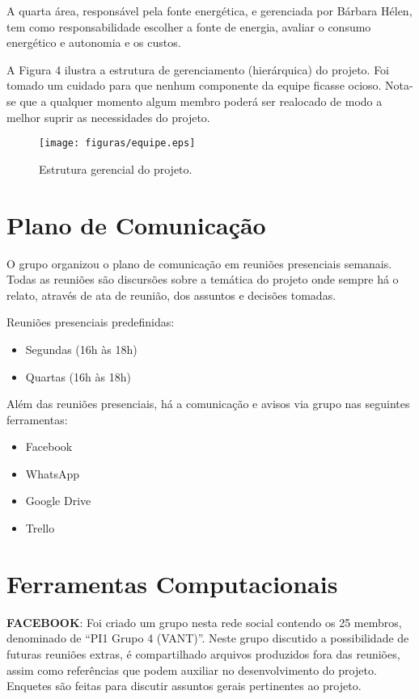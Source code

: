 A quarta área, responsável pela fonte energética, e gerenciada por Bárbara Hélen, tem como responsabilidade escolher a fonte de energia, avaliar o consumo energético e autonomia e os custos.
	
A Figura 4 ilustra a estrutura de gerenciamento (hierárquica) do projeto. Foi tomado um cuidado para que nenhum componente da equipe ficasse ocioso. Nota-se que a qualquer momento algum membro poderá ser realocado de modo a melhor suprir as necessidades do projeto.

\begin{figure}[ht]
	\centering
		\texttt{[image: figuras/equipe.eps]}
	\caption{Estrutura gerencial do projeto.}
\end{figure}

\section{Plano de Comunicação}
O grupo organizou o plano de comunicação em reuniões presenciais semanais. Todas as reuniões são discursões sobre a temática do projeto onde sempre há o relato, através de ata de reunião, dos assuntos e decisões tomadas. 

Reuniões presenciais predefinidas:
\begin{itemize}
	\item Segundas (16h às 18h)
	\item Quartas (16h às 18h)
\end{itemize}

Além das reuniões presenciais, há a comunicação e avisos via grupo nas seguintes ferramentas:
\begin{itemize}
	\item Facebook
	\item WhatsApp
	\item Google Drive
	\item Trello
\end{itemize}

\section{Ferramentas Computacionais}

\textbf{FACEBOOK}:
Foi criado um grupo nesta rede social contendo os 25 membros, denominado de “PI1 Grupo 4 (VANT)”. Neste grupo discutido a possibilidade de futuras reuniões extras, é compartilhado arquivos produzidos fora das reuniões, assim como referências que podem auxiliar no desenvolvimento do projeto. Enquetes são feitas para discutir assuntos gerais pertinentes ao projeto. 

